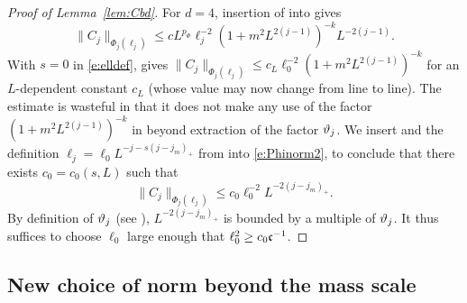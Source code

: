 \begin{proof}[Proof of Lemma~\ref{lem:Cbd}]
For $d=4$, insertion of  into  gives
\begin{equation}
    \label{e:Phinorm2}
    \|C_j\|_{\Phi_{j}(\ell_j)}
    \le
    c
    L^{p_\Phi}
    \ell_j^{-2}(1+m^2L^{2(j-1)})^{-k}
    L^{-2(j-1)}.
\end{equation}
With $s=0$ in \eqref{e:elldef},  gives
$\|C_j\|_{\Phi_{j}(\ell_j)} \le c_L \ell_0^{-2} (1+m^2L^{2(j-1)})^{-k}$
for an $L$-dependent constant $c_L$ (whose value may now change from line to line).
The estimate \cite[\eqref{IE-e:CLbd}]{BS-rg-IE}
is wasteful in that it does not make any use of the factor
$(1+m^2L^{2(j-1)})^{-k}$ in  beyond extraction of the factor $\vartheta_j$.
We insert  and the definition $\ell_j=\ell_0 L^{-j-s(j-j_m)_+}$ from
 into
\eqref{e:Phinorm2}, to conclude that there exists $c_0 = c_0(s, L)$ such that
\begin{equation}
    \|C_j\|_{\Phi_{j}(\ell_j)} \leq c_0 \ell_0^{-2} L^{-2(j - j_m)_+}
    .
\end{equation}
By definition of $\vartheta_j$ (see \cite[Section~\ref{IE-sec:frp}]{BS-rg-IE}),
$L^{-2(j - j_m)_+}$ is bounded by a multiple of $\vartheta_j$.
It thus suffices to choose $\ell_0$ large enough that
$\ell_0^2 \ge c_0 \mathfrak{c}^{-1}$.
\end{proof}


\subsection{New choice of norm beyond the mass scale}
\label{sec:newnorm}

